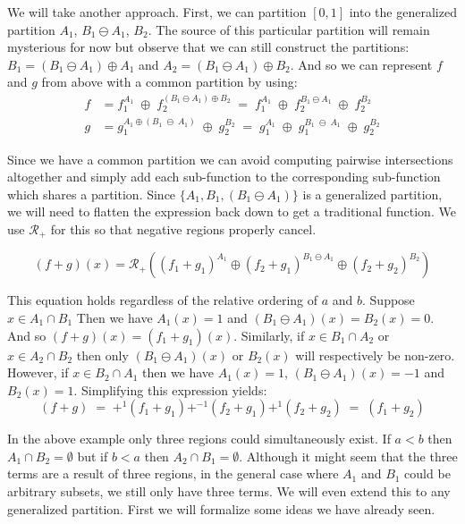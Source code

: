We will take another approach.
First, we can partition $[0,1]$ into the generalized partition $A_1$, $B_1 \ominus A_1$, $B_2$.
The source of this particular partition will remain mysterious for now but observe that we can still construct the partitions:
$B_1 = (B_1 \ominus A_1) \oplus A_1$ and $A_2 = (B_1 \ominus A_1) \oplus B_2$.
And so we can represent $f$ and $g$ from above with a common partition by using:
\begin{align*}
	f &=  f_1^{A_1} \;\oplus\; f_2^{(B_1 \ominus A_1) \oplus B_2}
		\;=\; f_1^{A_1} \;\oplus\; f_2^{B_1 \ominus A_1} \;\oplus\; f_2^{B_2} \\
	g &= g_1^{A_1 \oplus (B_1 \;\ominus\; A_1)} \;\oplus\; g_2^{B_2}
		\;=\; g_1^{A_1} \;\oplus\; g_1^{B_1 \;\ominus\; A_1} \;\oplus\; g_2^{B_2}
\end{align*}


Since we have a common partition we can avoid computing pairwise intersections altogether and simply add each 
sub-function to the corresponding sub-function which shares a partition.
Since $\{ A_1 , B_1, (B_1 \ominus A_1) \}$ is a generalized partition, we will need to flatten the expression back down
to get a traditional function.
We use $\mathcal{R}_+$ for this so that negative regions properly cancel. 

\begin{equation*}
	(f+g)(x) = \mathcal{R}_+ \left( (f_1 + g_1)^{A_1} 
			\oplus (f_2 + g_1)^{B_1 \ominus A_1} 
			\oplus (f_2 + g_2)^{B_2} \right)
\end{equation*}


This equation holds regardless of the relative ordering of $a$ and $b$.
Suppose $x \in A_1 \cap B_1$
Then we have $A_1(x)= 1$ and $(B_1 \ominus A_1)(x) = B_2(x) = 0$.
And so $(f+g)(x) = (f_1 + g_1)(x)$.
Similarly, if $x \in B_1 \cap A_2$ or $x \in A_2 \cap B_2$ then 
only $(B_1 \ominus A_1)(x)$ or $B_2(x)$ will respectively be non-zero.
However, if $x \in B_2 \cap A_1$ then we have $A_1(x) = 1$, $(B_1 \ominus A_1)(x) = -1$ and $B_2(x) = 1$.
Simplifying this expression yields:
\begin{equation*}
	(f+g) \;=\; +^1 (f_1 + g_1) +^{-1} (f_2 + g_1) +^1 (f_2 + g_2) \;=\; (f_1 + g_2)
\end{equation*}


In the above example only three regions could simultaneously exist.
If $a<b$ then $A_1 \cap B_2 = \emptyset$ but if $b<a$ then $A_2 \cap B_1 = \emptyset$.
Although it might seem that the three terms are a result of three regions, in the general case where 
$A_1$ and $B_1$ could be arbitrary subsets, we still only have three terms.
We will even extend this to any generalized partition.
First we will formalize some ideas we have already seen.


